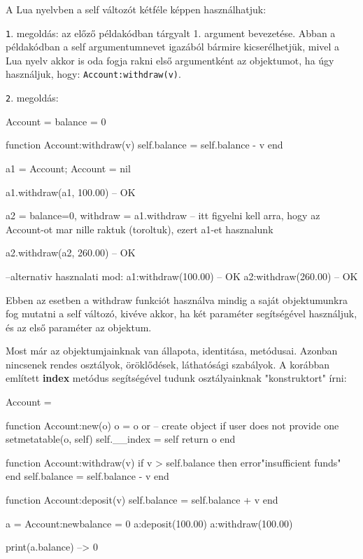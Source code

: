 A Lua nyelvben a self változót kétféle képpen használhatjuk:

\hspace{10mm}\texttt{1}. megoldás: az előző példakódban tárgyalt 1. argument bevezetése. Abban a példakódban a self argumentumnevet igazából bármire kicserélhetjük, mivel a Lua nyelv akkor is oda fogja rakni első argumentként az objektumot, ha úgy használjuk, hogy: \texttt{Account:withdraw(v)}.

\hspace{10mm}\texttt{2}. megoldás:
\begin{lua}
Account = {balance = 0}

function Account:withdraw(v)
	self.balance = self.balance - v
end

a1 = Account; Account = nil

a1.withdraw(a1, 100.00)   -- OK

a2 = {balance=0, withdraw = a1.withdraw} -- itt figyelni kell arra, hogy az Account-ot mar nille raktuk (toroltuk), ezert a1-et hasznalunk 

a2.withdraw(a2, 260.00) -- OK

--alternativ hasznalati mod:
a1:withdraw(100.00) -- OK
a2:withdraw(260.00) -- OK
\end{lua}
Ebben az esetben a withdraw funkciót használva mindig a saját objektumunkra fog mutatni a self változó, kivéve akkor, ha két paraméter segítségével használjuk, és az első paraméter az objektum.

Most már az objektumjainknak van állapota, identitása, metódusai. Azonban nincsenek rendes osztályok, öröklődések, láthatósági szabályok.\pagebreak
{}
A korábban említett \detokenize{__}\textbf{index} metódus segítségével tudunk osztályainknak "konstruktort" írni:
\begin{lua}
Account = {}

function Account:new(o)
	o = o or {}   -- create object if user does not provide one
	setmetatable(o, self)
	self.__index = self
	return o
end

function Account:withdraw(v)
	if v > self.balance then error"insufficient funds" end
	self.balance = self.balance - v
end

function Account:deposit(v)
	self.balance = self.balance + v
end

a = Account:new{balance = 0}
a:deposit(100.00)
a:withdraw(100.00)

print(a.balance) --> 0
\end{lua}

